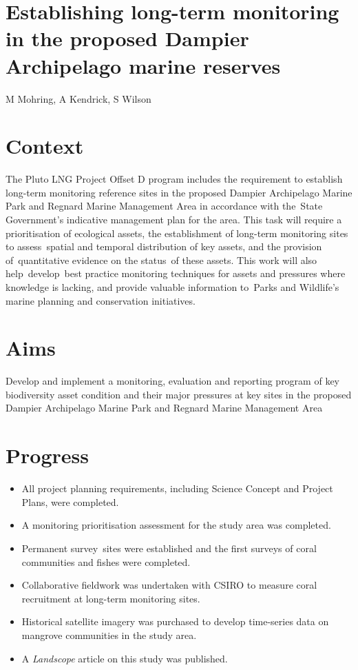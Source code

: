 \documentclass[version=last,
    paper=a4, %
    10pt, %
    usenames,
    dvipsnames,
    oneside, %
    headings=openany, %
    DIV=15 %
]{scrbook}
\begin{document}
\section*{Establishing long-term monitoring in the proposed Dampier Archipelago
marine reserves
}

M Mohring, A Kendrick, S Wilson


\section*{Context}
The Pluto LNG Project Offset D program includes the requirement to
establish long-term monitoring reference sites in the proposed Dampier
Archipelago Marine Park and Regnard Marine Management Area in accordance
with the~State Government's indicative management plan for the area.
This task will require a prioritisation of ecological assets, the
establishment of long-term monitoring sites to assess~spatial and
temporal distribution of key assets, and the provision of~quantitative
evidence on the status~of these assets. This work will also
help~develop~best practice monitoring techniques for assets and
pressures where knowledge is lacking, and provide valuable information
to~Parks and Wildlife's marine planning and conservation initiatives.



\section*{Aims}
Develop and implement a monitoring, evaluation and reporting program of
key biodiversity asset condition and their major pressures at key sites
in the proposed Dampier Archipelago Marine Park and Regnard Marine
Management Area



\section*{Progress}
\begin{itemize}
\itemsep1pt\parskip0pt
\item
  All project planning requirements, including Science Concept and
  Project Plans, were completed.
\item
  A monitoring prioritisation assessment for the study area was
  completed.
\item
  Permanent survey~sites were established and the first surveys of coral
  communities and fishes were completed.
\item
  Collaborative fieldwork was undertaken with CSIRO to measure coral
  recruitment at long-term monitoring sites.
\item
  Historical satellite imagery was purchased to develop time-series data
  on mangrove communities in the study area.
\item
  A \emph{Landscope} article on this study was published.
\end{itemize}
\end{document}

